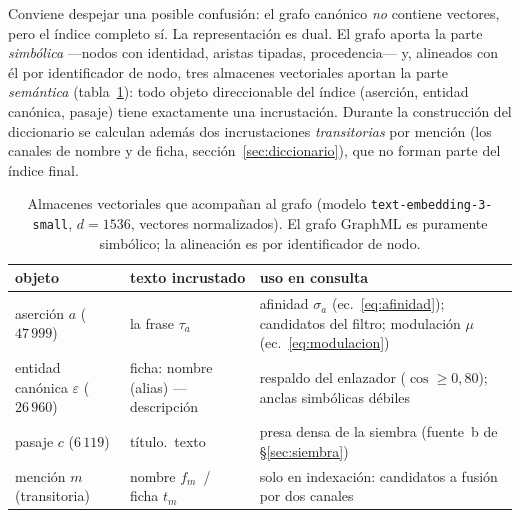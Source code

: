 \documentclass[11pt,a4paper]{article}
\begin{document}
Conviene despejar una posible confusión: el grafo canónico \emph{no}
contiene vectores, pero el índice completo sí. La representación es dual.
El grafo aporta la parte \emph{simbólica} ---nodos con identidad,
aristas tipadas, procedencia--- y, alineados con él por identificador de
nodo, tres almacenes vectoriales aportan la parte \emph{semántica}
(tabla~\ref{tab:embeddings}): todo objeto direccionable del índice
(aserción, entidad canónica, pasaje) tiene exactamente una incrustación.
Durante la construcción del diccionario se calculan además dos
incrustaciones \emph{transitorias} por mención (los canales de nombre y de
ficha, sección~\ref{sec:diccionario}), que no forman parte del índice
final.

\begin{table}[t]
\centering\footnotesize\setlength{\tabcolsep}{3.5pt}
\caption{Almacenes vectoriales que acompañan al grafo (modelo
\texttt{text-embedding-3-small}, $d=1536$, vectores normalizados). El grafo
GraphML es puramente simbólico; la alineación es por identificador de nodo.}
\label{tab:embeddings}
\begin{tabular}{llp{}}
\toprule
objeto & texto incrustado & uso en consulta\\
\midrule
aserción $a$ ($47\,999$) & la frase $\tau_a$ & afinidad $\sigma_a$
  (ec.~\ref{eq:afinidad}); candidatos del filtro; modulación $\mu$
  (ec.~\ref{eq:modulacion})\\
entidad canónica $\varepsilon$ ($26\,960$) & ficha: nombre (alias) ---
  descripción & respaldo del enlazador ($\cos\ge 0{,}80$); anclas
  simbólicas débiles\\
pasaje $c$ ($6\,119$) & título.\ texto & presa densa de la siembra
  (fuente~b de \S\ref{sec:siembra})\\
\midrule
mención $m$ (transitoria) & nombre $f_m$ \,/\, ficha $t_m$ & solo en
  indexación: candidatos a fusión por dos canales\\
\bottomrule
\end{tabular}
\end{table}
\end{document}
